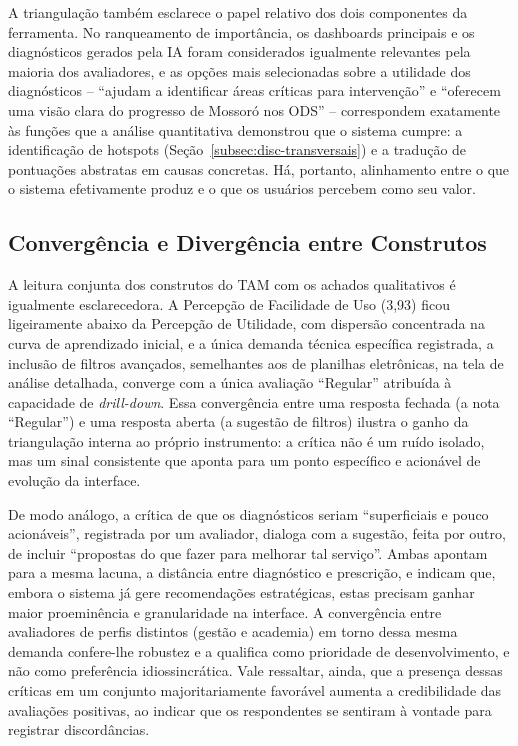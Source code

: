 A triangulação também esclarece o papel relativo dos dois componentes da ferramenta. No ranqueamento de importância, os dashboards principais e os diagnósticos gerados pela IA foram considerados igualmente relevantes pela maioria dos avaliadores, e as opções mais selecionadas sobre a utilidade dos diagnósticos -- ``ajudam a identificar áreas críticas para intervenção'' e ``oferecem uma visão clara do progresso de Mossoró nos ODS'' -- correspondem exatamente às funções que a análise quantitativa demonstrou que o sistema cumpre: a identificação de hotspots (Seção~\ref{subsec:disc-transversais}) e a tradução de pontuações abstratas em causas concretas. Há, portanto, alinhamento entre o que o sistema efetivamente produz e o que os usuários percebem como seu valor.

\subsection{Convergência e Divergência entre Construtos}
\label{subsec:disc-construtos}

A leitura conjunta dos construtos do TAM com os achados qualitativos é igualmente esclarecedora. A Percepção de Facilidade de Uso (3,93) ficou ligeiramente abaixo da Percepção de Utilidade, com dispersão concentrada na curva de aprendizado inicial, e a única demanda técnica específica registrada, a inclusão de filtros avançados, semelhantes aos de planilhas eletrônicas, na tela de análise detalhada, converge com a única avaliação ``Regular'' atribuída à capacidade de \textit{drill-down}. Essa convergência entre uma resposta fechada (a nota ``Regular'') e uma resposta aberta (a sugestão de filtros) ilustra o ganho da triangulação interna ao próprio instrumento: a crítica não é um ruído isolado, mas um sinal consistente que aponta para um ponto específico e acionável de evolução da interface.

De modo análogo, a crítica de que os diagnósticos seriam ``superficiais e pouco acionáveis'', registrada por um avaliador, dialoga com a sugestão, feita por outro, de incluir ``propostas do que fazer para melhorar tal serviço''. Ambas apontam para a mesma lacuna, a distância entre diagnóstico e prescrição, e indicam que, embora o sistema já gere recomendações estratégicas, estas precisam ganhar maior proeminência e granularidade na interface. A convergência entre avaliadores de perfis distintos (gestão e academia) em torno dessa mesma demanda confere-lhe robustez e a qualifica como prioridade de desenvolvimento, e não como preferência idiossincrática. Vale ressaltar, ainda, que a presença dessas críticas em um conjunto majoritariamente favorável aumenta a credibilidade das avaliações positivas, ao indicar que os respondentes se sentiram à vontade para registrar discordâncias.

